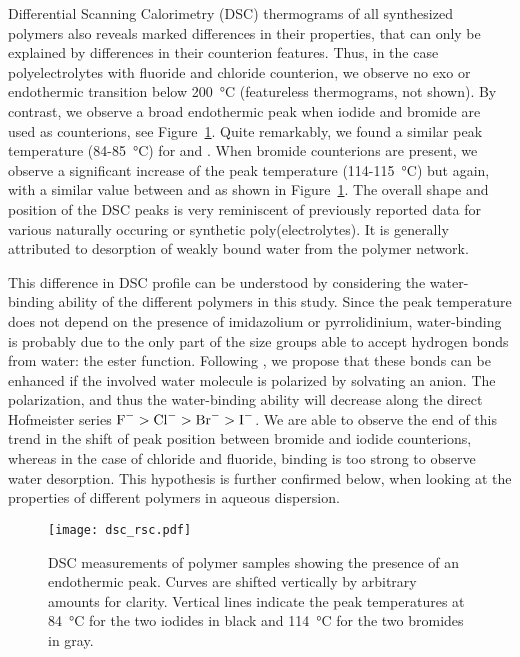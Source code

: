 \documentclass[twoside,twocolumn,9pt]{article}
\begin{document}
Differential Scanning Calorimetry (DSC) thermograms  of all synthesized polymers also reveals marked differences in their properties, that can only be explained by differences in their counterion features. Thus, in the case polyelectrolytes with fluoride and chloride counterion, we observe no exo or endothermic transition below \SI{200}{\celsius} (featureless thermograms, not shown). By contrast, we observe a broad endothermic peak when iodide and bromide are used as counterions, see Figure~\ref{fig:dsc}. Quite remarkably, we found a similar peak temperature (84-\SI{85}{\celsius}) for  and . When bromide counterions are present, we observe a significant increase of the peak temperature (114-\SI{115}{\celsius}) but again, with a similar value between  and  as shown in Figure~\ref{fig:dsc}. The overall shape and position of the DSC peaks is very reminiscent of previously reported data for various naturally occuring or synthetic poly(electrolytes)\cite{Li2005,Sarmento2006,Ostrowska-Czubenko2009a,Moin2015}. It is generally attributed to desorption of weakly bound water from the polymer network. %

This difference in DSC profile can be understood by considering the water-binding ability of the different polymers in this study. Since the peak temperature does not depend on the presence of imidazolium or pyrrolidinium, water-binding is probably due to the only part of the size groups able to accept hydrogen bonds from water: the ester function. Following \citet{Zhang2010a}, we propose that these bonds can be enhanced if the involved water molecule is polarized by solvating an anion. The polarization, and thus the water-binding ability will decrease along the direct Hofmeister series $\ce{F-}>\ce{Cl-}>\ce{Br-}>\ce{I-}$. We are able to observe the end of this trend in the shift of peak position between bromide and iodide counterions, whereas in the case of chloride and fluoride, binding is too strong to observe water desorption. This hypothesis is further confirmed below, when looking at the properties of different polymers in aqueous dispersion.

\begin{figure}
\texttt{[image: dsc\_rsc.pdf]}
\caption{DSC measurements of polymer samples showing the presence of an endothermic peak. Curves are shifted vertically by arbitrary amounts for clarity. Vertical lines indicate the peak temperatures at \SI{84}{\celsius} for the two iodides in black and \SI{114}{\celsius} for the two bromides in gray.}
\label{fig:dsc}
\end{figure}
\end{document}
